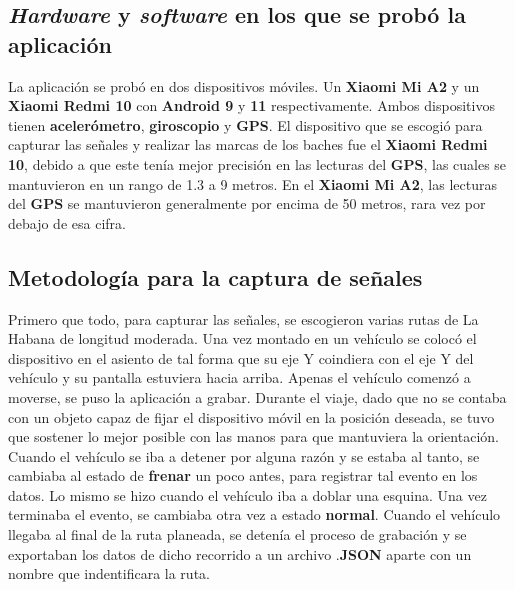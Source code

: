 	\subsection{\emph{Hardware} y \emph{software} en los que se probó la aplicación}
		La aplicación se probó en dos dispositivos móviles. Un \textbf{Xiaomi Mi A2} y un \textbf{Xiaomi Redmi 10} con \textbf{Android 9} y
		\textbf{11} respectivamente. Ambos dispositivos tienen \textbf{acelerómetro}, \textbf{giroscopio} y \textbf{GPS}. El dispositivo que 
		se escogió para capturar las señales y realizar las marcas de los baches fue el \textbf{Xiaomi Redmi 10}, debido a que este tenía mejor
		precisión en las lecturas del \textbf{GPS}, las cuales se mantuvieron en un rango de 1.3 a 9 metros. En el \textbf{Xiaomi Mi A2}, las 
		lecturas del \textbf{GPS} se mantuvieron generalmente por encima de 50 metros, rara vez por debajo de esa cifra.

	\subsection{Metodología para la captura de señales}
		Primero que todo, para capturar las señales, se escogieron varias rutas de La Habana de longitud moderada. Una vez montado en un vehículo
		se colocó el dispositivo en el asiento de tal forma que su eje Y coindiera con el eje Y del vehículo y su pantalla estuviera hacia arriba.
		Apenas el vehículo comenzó a moverse, se puso la aplicación a grabar. Durante el viaje, dado que no se contaba con un objeto capaz de fijar el
		dispositivo móvil en la posición deseada, se tuvo que sostener lo mejor posible con las manos para que mantuviera la orientación. \\
		\indent Cuando el vehículo se iba a detener por alguna razón y se estaba al tanto, se cambiaba al estado de \textbf{frenar} un poco antes, para
		registrar tal evento en los datos. Lo mismo se hizo cuando el vehículo iba a doblar una esquina. Una vez terminaba el evento, se cambiaba otra
		vez a estado \textbf{normal}. Cuando el vehículo llegaba al final de la ruta planeada, se detenía el proceso de grabación y se exportaban los
		datos de dicho recorrido a un archivo .\textbf{JSON} aparte con un nombre que indentificara la ruta.

